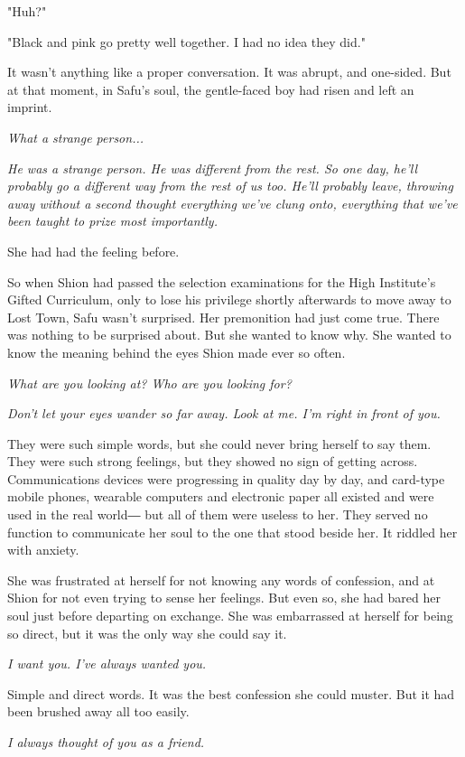 "Huh?"

"Black and pink go pretty well together. I had no idea they did."

It wasn't anything like a proper conversation. It was abrupt, and
one-sided. But at that moment, in Safu's soul, the gentle-faced boy had
risen and left an imprint.

\emph{What a strange person...}

\emph{He was a strange person. He was different from the rest. So one day,
	he'll probably go a different way from the rest of us too. He'll
	probably leave, throwing away without a second thought everything we've
	clung onto, everything that we've been taught to prize most importantly.}

She had had the feeling before.

So when Shion had passed the selection examinations for the High
Institute's Gifted Curriculum, only to lose his privilege shortly
afterwards to move away to Lost Town, Safu wasn't surprised. Her
premonition had just come true. There was nothing to be surprised about.
But she wanted to know why. She wanted to know the meaning behind the
eyes Shion made ever so often.

\emph{What are you looking at? Who are you looking for?}

\emph{Don't let your eyes wander so far away. Look at me. I'm right in front
	of you.}

They were such simple words, but she could never bring herself to say
them. They were such strong feelings, but they showed no sign of getting
across. Communications devices were progressing in quality day by day,
and card-type mobile phones, wearable computers and electronic paper all
existed and were used in the real world― but all of them were useless to
her. They served no function to communicate her soul to the one that
stood beside her. It riddled her with anxiety.

She was frustrated at herself for not knowing any words of confession,
and at Shion for not even trying to sense her feelings. But even so, she
had bared her soul just before departing on exchange. She was
embarrassed at herself for being so direct, but it was the only way she
could say it.

\emph{I want you. I've always wanted you.}

Simple and direct words. It was the best confession she could muster.
But it had been brushed away all too easily.

\emph{I always thought of you as a friend.}

